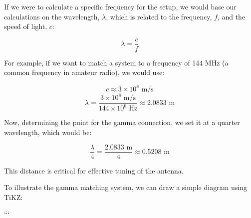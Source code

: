 If we were to calculate a specific frequency for the setup, we would base our calculations on the wavelength, $\lambda$, which is related to the frequency, $f$, and the speed of light, $c$:

\[
\lambda = \frac{c}{f}
\]

For example, if we want to match a system to a frequency of 144 MHz (a common frequency in amateur radio), we would use:

\[
c \approx 3 \times 10^8 \text{ m/s}
\]
\[
\lambda = \frac{3 \times 10^8 \text{ m/s}}{144 \times 10^6 \text{ Hz}} \approx 2.0833 \text{ m}
\]

Now, determining the point for the gamma connection, we set it at a quarter wavelength, which would be:

\[
\frac{\lambda}{4} = \frac{2.0833 \text{ m}}{4} \approx 0.5208 \text{ m}
\]

This distance is critical for effective tuning of the antenna.

To illustrate the gamma matching system, we can draw a simple diagram using TiKZ:

\begin{center}
\end{center}
```
